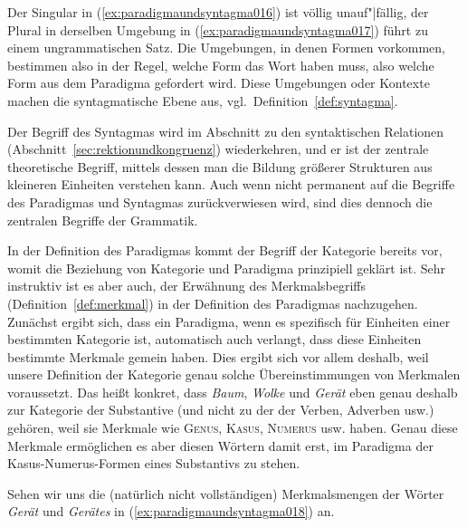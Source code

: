 Der Singular in (\ref{ex:paradigmaundsyntagma016}) ist völlig unauf"|fällig, der Plural in derselben Umgebung in (\ref{ex:paradigmaundsyntagma017}) führt zu einem ungrammatischen Satz.
Die Umgebungen, in denen Formen vorkommen, bestimmen also in der Regel, welche Form das Wort haben muss, also welche Form aus dem Paradigma gefordert wird.
Diese Umgebungen oder Kontexte machen die syntagmatische Ebene aus, vgl.\ Definition~\ref{def:syntagma}.



Der Begriff des Syntagmas wird im Abschnitt zu den syntaktischen Relationen (Abschnitt~\ref{sec:rektionundkongruenz}) wiederkehren, und er ist der zentrale theoretische Begriff, mittels dessen man die Bildung größerer Strukturen aus kleineren Einheiten verstehen kann.
Auch wenn nicht permanent auf die Begriffe des Paradigmas und Syntagmas zurückverwiesen wird, sind dies dennoch die zentralen Begriffe der Grammatik.


In der Definition des Paradigmas kommt der Begriff der Kategorie bereits vor, womit die Beziehung von Kategorie und Paradigma prinzipiell geklärt ist.
Sehr instruktiv ist es aber auch, der Erwähnung des Merkmalsbegriffs (Definition~\ref{def:merkmal}) in der Definition des Paradigmas nachzugehen.
Zunächst ergibt sich, dass ein Paradigma, wenn es spezifisch für Einheiten einer bestimmten Kategorie ist, automatisch auch verlangt, dass diese Einheiten bestimmte Merkmale gemein haben.
Dies ergibt sich vor allem deshalb, weil unsere Definition der Kategorie genau solche Übereinstimmungen von Merkmalen voraussetzt.
Das heißt konkret, dass \zB \textit{Baum}, \textit{Wolke} und \textit{Gerät} eben genau deshalb zur Kategorie der Substantive (und nicht zu der der Verben, Adverben usw.) gehören, weil sie Merkmale wie \textsc{Genus}, \textsc{Kasus}, \textsc{Numerus} usw. haben.
Genau diese Merkmale ermöglichen es aber diesen Wörtern damit erst, im Paradigma der Kasus-Numerus-Formen eines Substantivs zu stehen.

Sehen wir uns die (natürlich nicht vollständigen) Merkmalsmengen der Wörter \textit{Gerät} und \textit{Gerätes} in (\ref{ex:paradigmaundsyntagma018}) an.


